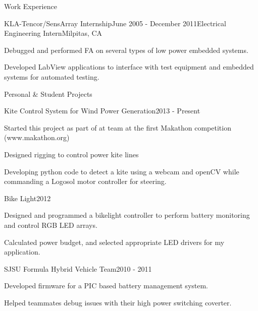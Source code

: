 \documentclass{resume} %
\begin{document}
\begin{rSection}{Work Experience}
\pagebreak[2]
\begin{rSubsection}{KLA-Tencor/SensArray Internship}{June 2005 - December 2011}{Electrical Engineering Intern}{Milpitas, CA}
\item Debugged and performed FA on several types of low power embedded systems. 
\item Developed LabView applications to interface with test equipment and embedded systems for automated testing.
\end{rSubsection}
\end{rSection}

\pagebreak[3]
\begin{rSection}{Personal \& Student Projects}

\vspace{-0.5em}
\begin{rProject}{Kite Control System for Wind Power Generation}{2013 - Present}
\item Started this project as part of at team at the first Makathon competition (www.makathon.org)
\item Designed rigging to control power kite lines 
\item Developing python code to detect a kite using a webcam and openCV while commanding a Logosol motor controller for steering.
\end{rProject}

\vspace{-0.5em}
\begin{rProject}{Bike Light}{2012}
\item Designed and programmed a bikelight controller to perform battery monitoring and control RGB LED arrays.
\item Calculated power budget, and selected appropriate LED drivers for my application.
\end{rProject}
\vspace{-0.5em}

\begin{rProject}{SJSU Formula Hybrid Vehicle Team}{2010 - 2011}
\item Developed firmware for a PIC based battery management system.
\item Helped teammates debug issues with their high power switching coverter.
\end{rProject}
\end{rSection}
\end{document}
